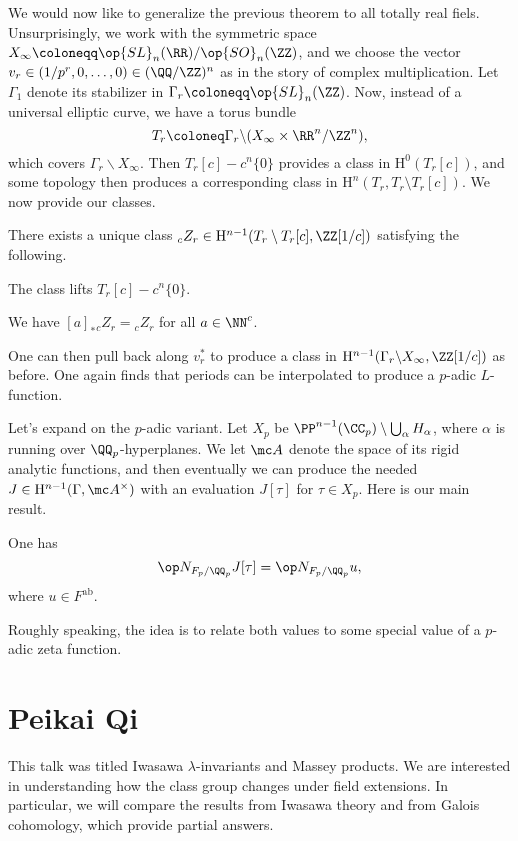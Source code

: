\documentclass{article}
\begin{document}
We would now like to generalize the previous theorem to all totally real fiels. Unsurprisingly, we work with the symmetric space $X_\infty\coloneqq\op{SL}_n(\RR)/\op{SO}_n(\ZZ)$, and we choose the vector $v_r\in(1/p^r,0,\ldots,0)\in(\QQ/\ZZ)^n$ as in the story of complex multiplication. Let $\Gamma_1$ denote its stabilizer in $\Gamma_r\coloneqq\op{SL}_n(\ZZ)$. Now, instead of a universal elliptic curve, we have a torus bundle
\[T_r\coloneq\Gamma_r\backslash(X_\infty\times\RR^n/\ZZ^n),\]
which covers $\Gamma_r\backslash X_\infty$. Then $T_r[c]-c^n\{0\}$ provides a class in $\mathrm H^0(T_r[c])$, and some topology then produces a corresponding class in $\mathrm H^n(T_r,T_r\setminus T_r[c])$. We now provide our classes.
\begin{theorem}
	There exists a unique class $_cZ_r\in\mathrm H^{n-1}(T_r\setminus T_r[c],\ZZ[1/c])$ satisfying the following.
	\begin{listroman}
		\item The class lifts $T_r[c]-c^n\{0\}$.
		\item We have $[a]_*{_cZ_r}={_cZ_r}$ for all $a\in\NN^c$.
	\end{listroman}
\end{theorem}
One can then pull back along $v_r^*$ to produce a class in $\mathrm H^{n-1}(\Gamma_r\backslash X_\infty,\ZZ[1/c])$ as before. One again finds that periods can be interpolated to produce a $p$-adic $L$-function.

Let's expand on the $p$-adic variant. Let $X_p$ be $\PP^{n-1}(\CC_p)\setminus\bigcup_\alpha H_\alpha$, where $\alpha$ is running over $\QQ_p$-hyperplanes. We let $\mc A$ denote the space of its rigid analytic functions, and then eventually we can produce the needed $J\in\mathrm H^{n-1}(\Gamma,\mc A^\times)$ with an evaluation $J[\tau]$ for $\tau\in X_p$. Here is our main result.
\begin{theorem}
	One has
	\[\op N_{F_p/\QQ_p}J[\tau]=\op N_{F_p/\QQ_p}u,\]
	where $u\in F^{\mathrm{ab}}$.
\end{theorem}
Roughly speaking, the idea is to relate both values to some special value of a $p$-adic zeta function.

\section{Peikai Qi}
This talk was titled Iwasawa $\lambda$-invariants and Massey products. We are interested in understanding how the class group changes under field extensions. In particular, we will compare the results from Iwasawa theory and from Galois cohomology, which provide partial answers.
\end{document}
